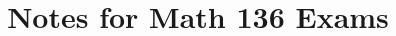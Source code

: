 \documentclass[9pt, landscape]{amsart}
\title{Notes for Math 136 Exams}
\theoremstyle{plain}
\newcommand{\1}{\mathbf{1}}
\begin{document}
 
\begin{multicols}{2}






\end{multicols}
\end{document}
